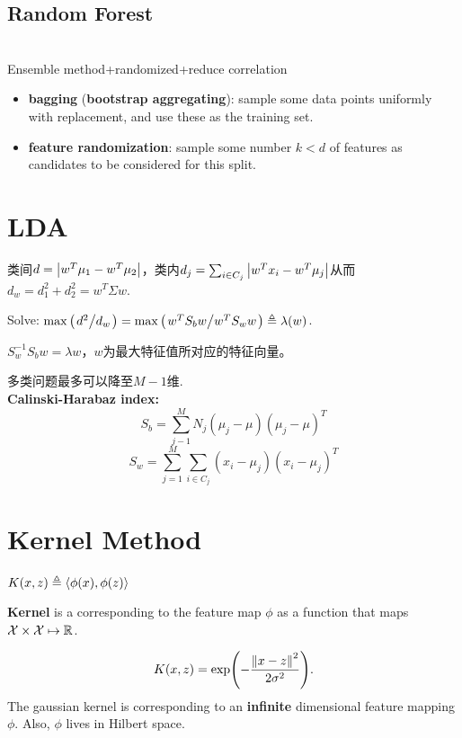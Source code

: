 \documentclass[a4paper,landscape]{article}
\begin{document}
\begin{tiny}
\begin{multicols}{4}
		\subsection{Random Forest}
		\\
		Ensemble method+randomized+reduce correlation
		\begin{itemize}[topsep=0pt]
			\item
			      \textbf{bagging} (\textbf{bootstrap aggregating}): sample some data points uniformly with replacement, and use these as the training set.
			\item
			      \textbf{feature randomization}: sample some number  $k < d$ of features as candidates to be considered for this split.
		\end{itemize}

		\section{LDA}

		类间$d=\qty|w^T\mu_1-w^T\mu_2|$，类内$d_j=\sum_{i\in C_j}\qty|w^Tx_i-w^T\mu_j|$从而$d_w=d_1^2+d_2^2=w^T\Sigma w$.

		Solve: $\max \qty(\flatfrac{d^2}{d_w})=\max\qty(\flatfrac{w^TS_bw}{w^TS_ww})\defeq\lambda(w)$.
		\begin{thm}
			$S_w^{-1}S_b w=\lambda w$，$w$为最大特征值所对应的特征向量。
		\end{thm}
		\begin{remark}
			多类问题最多可以降至$M-1$维.\\
			\textbf{Calinski-Harabaz index:}
			\[S_b=\sum_{j-1}^M N_j(\mu_j-\mu)(\mu_j-\mu)^T\]
			\[S_w=\sum_{j=1}^M\sum_{i\in C_j}(x_i-\mu_j)(x_i-\mu_j)^T\]
		\end{remark}

		\section{Kernel Method}
		$K(x,z)\triangleq \langle \phi(x),\phi(z)\rangle$
		\begin{remark}
			\textbf{Kernel} is a corresponding to the feature map $\phi$ as a function that maps $\mathcal{X}\times\mathcal{X}\mapsto \mathbb{R}$.
		\end{remark}

		\begin{defi}
			\[
				K(x,z)=\exp(-\frac{\norm{x-z}^2}{2\sigma^2})
				.\]
			The gaussian kernel is corresponding to an \textbf{infinite} dimensional feature mapping $\phi$. Also, $\phi$ lives in Hilbert space.
		\end{defi}


\end{multicols}
\end{tiny}
\end{document}
